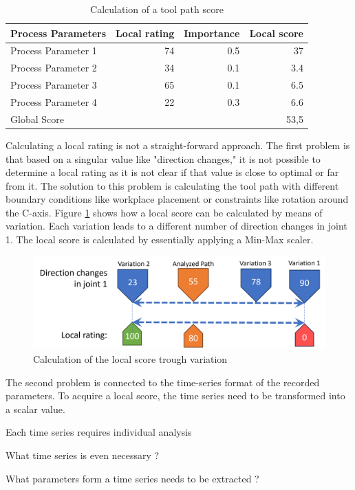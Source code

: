 \begin{table}[H]
	\centering
	\begin{tabular}{||l|r|r|r||}
		Process Parameters & Local rating & Importance & Local score\\
		\hline
		\hline
		\hline
		
		Process Parameter 1 & 74 & 0.5 & 37\\
		Process Parameter 2 & 34& 0.1&3.4\\
		Process Parameter 3& 65& 0.1&6.5\\
		Process Parameter 4& 22&0.3&6.6\\
		\hline
		\hline
		\hline
		Global Score& & &53,5\\
		\hline
		\hline
	\end{tabular}
	
	\caption{Calculation of a tool path score}
	\label{weighting}
\end{table}

Calculating a local rating is not a straight-forward approach. The first problem is that based on a singular value like "direction changes," it is not possible to determine a local rating as it is not clear if that value is close to optimal or far from it.
The solution to this problem is calculating the tool path with different boundary conditions like workplace placement or constraints like rotation around the C-axis.
Figure \ref{Localscore} shows how a local score can be calculated by means of variation. Each variation leads to a different number of direction changes in joint 1. The local score is calculated by essentially applying a Min-Max scaler.

\begin{figure}[H]
	\centerline{\includegraphics[scale=.65]{figures/localscore.png}}
	\caption{Calculation of the local score trough variation}
	\label{Localscore}
\end{figure}

The second problem is connected to the time-series format of the recorded parameters. To acquire a local score, the time series need to be transformed into a scalar value.


Each time series requires individual analysis


What time series is even necessary ? 


What parameters form a time series needs to be extracted ?





